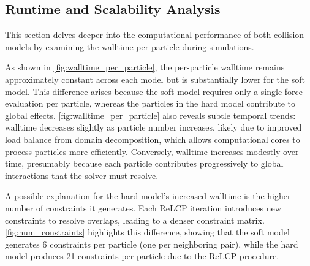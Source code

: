\documentclass[conference]{IEEEtran}
\begin{document}
\subsection{Runtime and Scalability Analysis}
\label{sec:complexity_scalability}

This section delves deeper into the computational performance of both collision models by examining the walltime per particle during simulations.

As shown in \autoref{fig:walltime_per_particle}, the per-particle walltime remains approximately constant across each model but is substantially lower for the soft model. This difference arises because the soft model requires only a single force evaluation per particle, whereas the particles in the hard model contribute to global effects. \autoref{fig:walltime_per_particle} also reveals subtle temporal trends: walltime decreases slightly as particle number increases, likely due to improved load balance from domain decomposition, which allows computational cores to process particles more efficiently. Conversely, walltime increases modestly over time, presumably because each particle contributes progressively to global interactions that the solver must resolve.

A possible explanation for the hard model's increased walltime is the higher number of constraints it generates. Each ReLCP iteration introduces new constraints to resolve overlaps, leading to a denser constraint matrix. \autoref{fig:num_constraints} highlights this difference, showing that the soft model generates 6 constraints per particle (one per neighboring pair), while the hard model produces 21 constraints per particle due to the ReLCP procedure.
\end{document}
